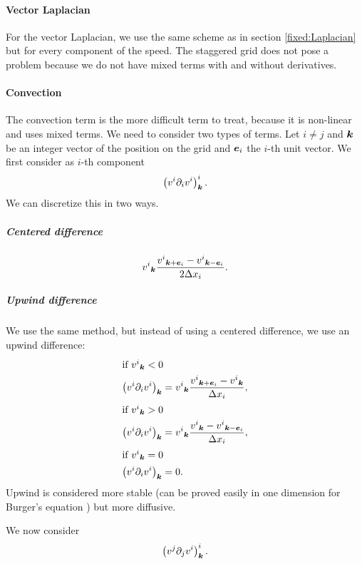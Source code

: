 \paragraph{Vector Laplacian}
\label{fixed:vect:laplacian}
For the vector Laplacian, we use the same scheme as in section \ref{fixed:Laplacian} but for every component of the speed.
The staggered grid does not pose a problem because we do not have mixed terms with and without derivatives.

\paragraph{Convection}

The convection term is the more difficult term to treat, because it is non-linear and uses mixed terms.
We need to consider two types of terms. Let $i\neq j$ and ${\boldsymbol {k}}$ be an integer vector of the position on the grid
and ${\boldsymbol {e}}_i$ the $i$-th unit vector.
We first consider as $i$-th component
\begin{equation}
\left(v^{i}\partial_{i}v^{i}\right)^{i}_{{\boldsymbol {k}}}.
\end{equation}
We can discretize this in two ways.

\subparagraph{Centered difference}
\begin{equation}
{v^{i}}_{{\boldsymbol {k}}}\frac{{v^{i}}_{{\boldsymbol {k}}+{\boldsymbol {e}}_i}-{v^{i}}_{{\boldsymbol {k}}-{\boldsymbol {e}}_i}}{2\Delta x_{i}}.
\end{equation}

\subparagraph{Upwind difference}
\label{fixed:upwind}

We use the same method, but instead of using a centered difference, we use an upwind difference:
\begin{align}
\intertext{if ${v^{i}}_{{\boldsymbol {k}}}<0$}
\left(v^{i}\partial_{i}v^{i}\right)_{{\boldsymbol {k}}}&={v^{i}}_{{\boldsymbol {k}}}\frac{{v^{i}}_{{\boldsymbol {k}}+{\boldsymbol {e}}_i}-{v^{i}}_{{\boldsymbol {k}}}}{\Delta x_{i}},\\
\intertext{if ${v^{i}}_{{\boldsymbol {k}}}>0$}
\left(v^{i}\partial_{i}v^{i}\right)_{{\boldsymbol {k}}}&={v^{i}}_{{\boldsymbol {k}}}\frac{{v^{i}}_{{\boldsymbol {k}}}-{v^{i}}_{{\boldsymbol {k}}-{\boldsymbol {e}}_i}}{\Delta x_{i}},\\
\intertext{if ${v^{i}}_{{\boldsymbol {k}}}=0$}
\left(v^{i}\partial_{i}v^{i}\right)_{{\boldsymbol {k}}}&=0.
\end{align}
Upwind is considered more stable (can be proved easily in one dimension for Burger's equation \cite{citeulike:11163809}) but more diffusive.

We now consider
\begin{equation}
\left(v^{j}\partial_{j}v^{i}\right)^{i}_{{\boldsymbol {k}}}.
\end{equation}

